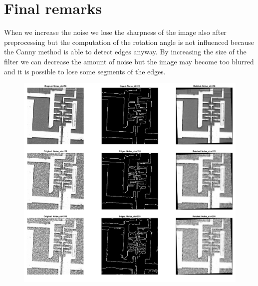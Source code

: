 \documentclass[12pt,a4paper,oneside,final,titlepage,openany,onecolumn]{article}
\begin{document}
	\section*{Final remarks}
	\par
		When we increase the noise we lose the sharpness of the image also after preprocessing but the computation of the rotation angle is not influenced because the Canny method is able to detect edges anyway.
		\newline
		By increasing the size of the filter we can decrease the amount of noise but the image may become too blurred and it is possible to lose some segments of the edges.
		\begin{figure}[H]
			\includegraphics[width=\linewidth]{images/noise_comp.png}
		\end{figure}
\end{document}
